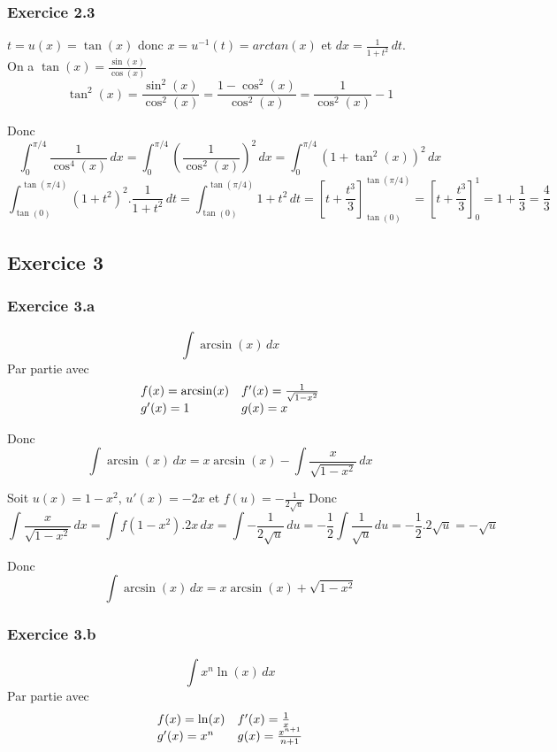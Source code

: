 \documentclass[]{book}
\theoremstyle{definition}
\begin{document}
\subsubsection*{Exercice 2.3}
$t = u(x) = \tan(x)$ donc $x = u^{-1}(t) = arctan(x)$ et $dx= \frac{1}{1+t^2}\,dt$.\\

On a $\tan(x)=\frac{\sin(x)}{\cos(x)}$
$$\tan^2(x)=\frac{\sin^2(x)}{\cos^2(x)} = \frac{1-\cos^2(x)}{\cos^2(x)} = \frac{1}{\cos^2(x)} - 1$$

Donc
$$\int_{0}^{\pi/4}{\frac{1}{\cos^4(x)}\,dx} = \int_{0}^{\pi/4}{\left(\frac{1}{\cos^2(x)}\right)^2\,dx}=\int_{0}^{\pi/4}{(1+\tan^2(x))^2\,dx}$$
$$\int_{\tan(0)}^{\tan(\pi/4)}{(1+t^2)^2.\frac{1}{1+t^2}\,dt} = \int_{\tan(0)}^{\tan(\pi/4)}{1+t^2\,dt} = [t+\frac{t^3}{3}]_{\tan(0)}^{\tan(\pi/4)} = \left[t+\frac{t^3}{3}\right]_{0}^{1} = 1+\frac{1}{3} = \frac{4}{3}$$


\subsection*{Exercice 3}
\subsubsection*{Exercice 3.a}
$$\int{\arcsin(x)\,dx}$$
Par partie avec
$$
\begin{array}{l l}
f(x) = \arcsin(x) & f'(x)=\frac{1}{\sqrt{1-x^2}} \\
g'(x)= 1 & g(x) = x \\
\end{array}
$$

Donc
$$\int{\arcsin(x)\,dx} = x\arcsin(x) - \int{\frac{x}{\sqrt{1-x^2}}\,dx}$$

Soit $u(x)=1-x^2$, $u'(x)=-2x$ et $f(u)=-\frac{1}{2\sqrt{u}}$
Donc
$$\int{\frac{x}{\sqrt{1-x^2}}\,dx} = \int{f(1-x^2).2x\,dx} = \int{-\frac{1}{2\sqrt{u}}\,du} = -\frac{1}{2}\int{\frac{1}{\sqrt{u}}\,du} = -\frac{1}{2}.2\sqrt{u} = -\sqrt{u}$$

Donc
$$\int{\arcsin(x)\,dx} = x\arcsin(x) + \sqrt{1-x^2}$$

\subsubsection*{Exercice 3.b}
$$\int{x^n\ln(x)\,dx}$$
Par partie avec
$$
\begin{array}{l l}
f(x) = \ln(x) & f'(x)=\frac{1}{x} \\
g'(x)= x^n & g(x) = \frac{x^{n+1}}{n+1} \\
\end{array}
$$
\end{document}
